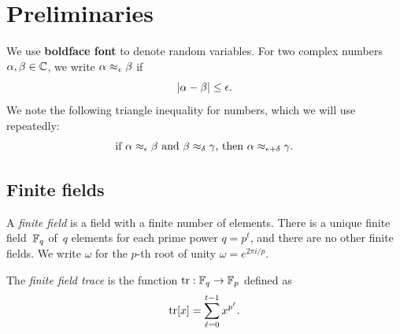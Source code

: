
\section{Preliminaries}\label{sec:prelims}

We use \textbf{boldface font} to denote random variables.
For two complex numbers $\alpha, \beta \in \mathbb C$, we write
$\alpha \approx_{\epsilon} \beta$ if
\begin{equation*}
|\alpha - \beta| \leq \epsilon.
\end{equation*}
We note the following triangle inequality for numbers, which we will use repeatedly:
\begin{equation}\label{eq:triangle-inequality-for-numbers}
\text{if $\alpha \approx_{\epsilon} \beta$ and $\beta \approx_{\delta} \gamma$, then $\alpha \approx_{\epsilon+\delta}\gamma$.}
\end{equation}

\subsection{Finite fields}

A \emph{finite field} is a field with a finite number of elements.
There is a unique finite field~$\mathbb F_q$ of~$q$ elements for each prime power $q = p^t$,
and there are no other finite fields.
We write $\omega$ for the $p$-th root of unity $\omega = e^{2 \pi i/p}$.

\begin{definition}
The \emph{finite field trace} is the function $\mathrm{tr}:\mathbb F_q \rightarrow \mathbb F_p$ defined as
\begin{equation*}
\mathrm{tr}[x] = \sum_{\ell=0}^{t-1} x^{p^{\ell}}.
\end{equation*}
\end{definition}

